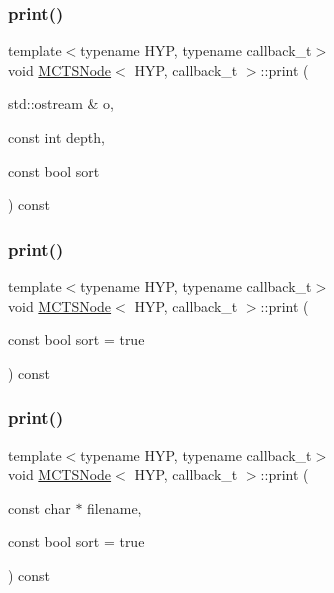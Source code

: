 \subsubsection{\texorpdfstring{print()}{print()}\hspace{0.1cm}{\footnotesize\ttfamily [1/3]}}
{\footnotesize\ttfamily template$<$typename H\+YP, typename callback\+\_\+t$>$ \\
void \hyperlink{class_m_c_t_s_node}{M\+C\+T\+S\+Node}$<$ H\+YP, callback\+\_\+t $>$\+::print (\begin{DoxyParamCaption}\item[{std\+::ostream \&}]{o,  }\item[{const int}]{depth,  }\item[{const bool}]{sort }\end{DoxyParamCaption}) const\hspace{0.3cm}{\ttfamily [inline]}}

\mbox{\label{class_m_c_t_s_node_a35f1dd261e8d76f652c21a53ac78137c}} 
\subsubsection{\texorpdfstring{print()}{print()}\hspace{0.1cm}{\footnotesize\ttfamily [2/3]}}
{\footnotesize\ttfamily template$<$typename H\+YP, typename callback\+\_\+t$>$ \\
void \hyperlink{class_m_c_t_s_node}{M\+C\+T\+S\+Node}$<$ H\+YP, callback\+\_\+t $>$\+::print (\begin{DoxyParamCaption}\item[{const bool}]{sort = {\ttfamily true} }\end{DoxyParamCaption}) const\hspace{0.3cm}{\ttfamily [inline]}}

\mbox{\label{class_m_c_t_s_node_ac49067508200793a8cb63524114b5c01}} 
\subsubsection{\texorpdfstring{print()}{print()}\hspace{0.1cm}{\footnotesize\ttfamily [3/3]}}
{\footnotesize\ttfamily template$<$typename H\+YP, typename callback\+\_\+t$>$ \\
void \hyperlink{class_m_c_t_s_node}{M\+C\+T\+S\+Node}$<$ H\+YP, callback\+\_\+t $>$\+::print (\begin{DoxyParamCaption}\item[{const char $\ast$}]{filename,  }\item[{const bool}]{sort = {\ttfamily true} }\end{DoxyParamCaption}) const\hspace{0.3cm}{\ttfamily [inline]}}


